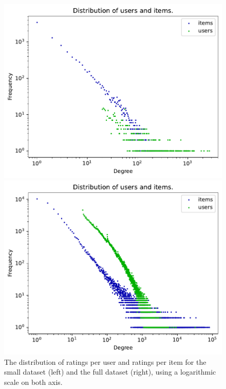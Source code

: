 \documentclass{article}
\begin{document}
\begin{figure}[h!]
    \centering
    \captionsetup{justification=centering}
    \begin{minipage}{.5\textwidth}
        \centering
        \includegraphics[width=\textwidth]{graphics/small_user_item_dist.pdf}
    \end{minipage}%
    \begin{minipage}{.5\textwidth}
        \centering
        \includegraphics[width=\textwidth]{graphics/full_user_item_dist.pdf}
    \end{minipage}
    \caption{The distribution of ratings per user and ratings per item for the small dataset (left) and the full dataset (right), using a logarithmic scale on both axis.}
    \label{d_new}
\end{figure}
\end{document}
